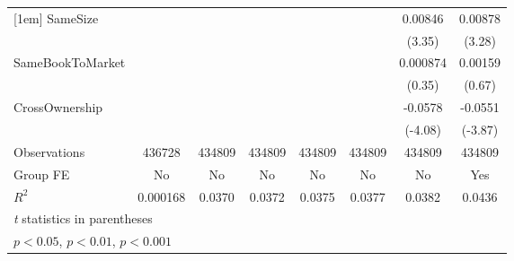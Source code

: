 {\begin{tabular}{l*{7}{c}}
[1em]
SameSize        &                  &                  &                  &                  &                  &  0.00846\sym{**} &  0.00878\sym{**} \\
                &                  &                  &                  &                  &                  &   (3.35)         &   (3.28)         \\
[1em]
SameBookToMarket&                  &                  &                  &                  &                  & 0.000874         &  0.00159         \\
                &                  &                  &                  &                  &                  &   (0.35)         &   (0.67)         \\
[1em]
CrossOwnership  &                  &                  &                  &                  &                  &  -0.0578\sym{***}&  -0.0551\sym{***}\\
                &                  &                  &                  &                  &                  &  (-4.08)         &  (-3.87)         \\
\hline
Observations    &   436728         &   434809         &   434809         &   434809         &   434809         &   434809         &   434809         \\
Group FE        &       No         &       No         &       No         &       No         &       No         &       No         &      Yes         \\
$ R^2 $         & 0.000168         &   0.0370         &   0.0372         &   0.0375         &   0.0377         &   0.0382         &   0.0436         \\
\hline\hline
\multicolumn{8}{l}{\footnotesize \textit{t} statistics in parentheses}\\
\multicolumn{8}{l}{\footnotesize \sym{*} \(p<0.05\), \sym{**} \(p<0.01\), \sym{***} \(p<0.001\)}\\
\end{tabular}
}
